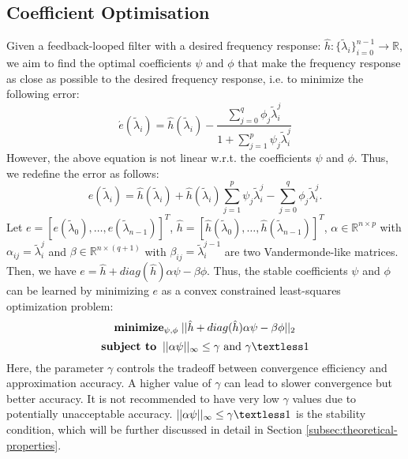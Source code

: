 \documentclass{article}
\begin{document}
\subsection{Coefficient Optimisation}
Given a feedback-looped filter with a desired frequency response: $\hat{h}:\{\tilde{\lambda}_i\}^{n-1}_{i=0}\rightarrow \mathbb{R}$, we aim to find the optimal coefficients $\psi$ and $\phi$ that make the frequency response as close as possible to the desired frequency response, i.e. to minimize the following error:
\begin{equation}
\acute{e}(\tilde{\lambda}_i) = \hat{h}(\tilde{\lambda}_i) - \frac{\sum_{j=0}^{q} \phi_j  \tilde{\lambda}_i^j}{1+\sum_{j=1}^{p} \psi_j  \tilde{\lambda}_i^j}
\end{equation}
However, the above equation is not linear w.r.t. the coefficients $\psi$ and $\phi$. Thus, we redefine the error as follows:
\begin{equation}
e(\tilde{\lambda}_i) = \hat{h}(\tilde{\lambda}_i) + \hat{h}(\tilde{\lambda}_i) \sum_{j=1}^{p} \psi_j  \tilde{\lambda}_i^j - \sum_{j=0}^{q} \phi_j  \tilde{\lambda}_i^j.
\end{equation}
Let $e=[e(\tilde{\lambda}_0),\dots,e(\tilde{\lambda}_{n-1})]^T$, $\hat{h}=[\hat{h}(\tilde{\lambda}_0),\dots,\hat{h}(\tilde{\lambda}_{n-1})]^T$, $\alpha\in \mathbb{R}^{n\times p}$ with $\alpha_{ij}=\tilde{\lambda}_i^j$ and $\beta\in \mathbb{R}^{n\times (q+1)}$ with $\beta_{ij}=\tilde{\lambda}_i^{j-1}$ are two Vandermonde-like matrices. Then, we have $e=\hat{h}+diag(\hat{h})\alpha\psi - \beta \phi$.
 Thus, the stable coefficients $\psi$  and $\phi$ can be learned by minimizing $e$ as a convex constrained least-squares optimization problem:
\begin{equation}\label{equ:arma-filter-optimizer}
{\text{\textbf{minimize}}}_{\psi,\phi}\;||\hat{h}+diag(\hat{h})\alpha\psi - \beta \phi||_2
\end{equation}
\[
	\text{\textbf{subject to}}\;\;||\alpha\psi||_\infty \le \gamma \text{ and }\gamma \textless 1
\]
Here, the parameter $\gamma$ controls the tradeoff between convergence efficiency and approximation accuracy. A higher value of $\gamma$ can lead to slower convergence but better accuracy. It is not recommended to have very low $\gamma$ values due to potentially unacceptable accuracy. $||\alpha\psi||_\infty \le \gamma \textless 1$ is the stability condition, which will be further discussed in detail in Section \ref{subsec:theoretical-properties}.
\end{document}
